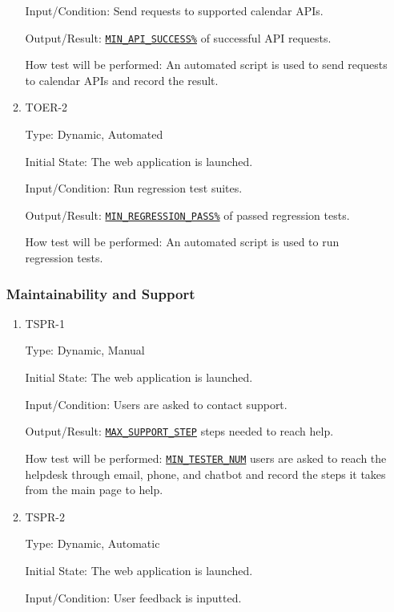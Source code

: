 \documentclass[12pt, titlepage]{article}
\begin{document}
\begin{enumerate}
\begin{enumerate}
Input/Condition: Send requests to supported calendar APIs.
					
Output/Result: \hyperref[MIN_API_SUCCESS]{\texttt{MIN\_API\_SUCCESS\%}} of successful API requests.
					
How test will be performed: An automated script is used to send requests to calendar APIs and record the result.


\item{TOER-2\\}\label{TOER-2}

Type: Dynamic, Automated
					
Initial State: The web application is launched.
					
Input/Condition: Run regression test suites.
					
Output/Result: \hyperref[MIN_REGRESSION_PASS]{\texttt{MIN\_REGRESSION\_PASS\%}} of passed regression tests.
					
How test will be performed: An automated script is used to run regression tests.

\end{enumerate}
\subsubsection{Maintainability and Support}

\begin{enumerate}
\item{TSPR-1\\}\label{TSPR-1}

Type: Dynamic, Manual
					
Initial State: The web application is launched.
					
Input/Condition: Users are asked to contact support.
					
Output/Result: \hyperref[MAX_SUPPORT_STEP]{\texttt{MAX\_SUPPORT\_STEP}} steps needed to reach help.
					
How test will be performed: \hyperref[MIN_TESTER_NUM]{\texttt{MIN\_TESTER\_NUM}} users are asked to reach the helpdesk through email, phone, and chatbot and record the steps it takes from the main page to help.


\item{TSPR-2\\}\label{TSPR-2}

Type: Dynamic, Automatic
					
Initial State: The web application is launched.
					
Input/Condition: User feedback is inputted.
					

\end{enumerate}
\end{enumerate}
\end{document}
